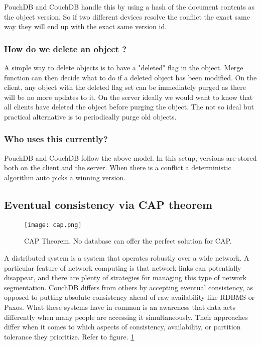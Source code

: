 PouchDB and CouchDB handle this by using a hash of the document contents as the object version. So if two 
different devices resolve the conflict the exact same way they will end up with the exact same version id.

\subsubsection{How do we delete an object ?}

A simple way to delete objects is to have a "deleted" flag in the object. 
Merge function can then decide what to do if a deleted object has been modified. 
On the client, any object with the deleted flag set can be immediately purged as 
there will be no more updates to it. On the server ideally we would want to know 
that all clients have deleted the object before purging the object. The not so ideal 
but practical alternative is to periodically purge old objects.

\subsubsection{Who uses this currently?}

PouchDB and CouchDB follow the above model. In this setup, versions are stored both on the client and 
the server. When there is a conflict a deterministic algorithm auto picks a winning version.~\cite{HasuraOfflineFirst}


\subsection{Eventual consistency via CAP theorem}

\begin{figure}[h!]
    \begin{center}
        \texttt{[image: cap.png]}
    \end{center}
    \caption{CAP Theorem. No database can offer the perfect solution for CAP.}
    \label{fig:cap}
\end{figure}

A distributed system is a system that operates robustly over a wide network. 
A particular feature of network computing is that network links can potentially 
disappear, and there are plenty of strategies for managing this type of network 
segmentation. CouchDB differs from others by accepting eventual consistency, 
as opposed to putting absolute consistency ahead of raw availability like 
RDBMS or Paxos. What these systems have in common is an awareness that data 
acts differently when many people are accessing it simultaneously. 
Their approaches differ when it comes to which aspects of consistency, 
availability, or partition tolerance they prioritize. Refer to figure. \ref{fig:cap}

